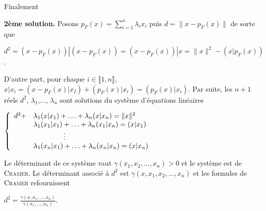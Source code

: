 {\begin{enumerate}
{Finalement 

\begin{center}
\end{center}

\textbf{2ème solution.} Posons $p_F(x) =\sum_{i=1}^{n}\lambda_ix_i$ puis  $d =\|x-p_F(x)\|$ de sorte que

\begin{center}
$d^2 =(x-p_F(x))|(x-p_F(x)) =(x-p_F(x))|x =\|x\|^2 -(x|p_F(x))$.
\end{center}

D'autre part, pour chaque $i\in\llbracket1,n\rrbracket$, $x|x_i=(x-p_F(x)|x_I)+(p_F(x)|x_i)=(p_F(x)|x_i)$. Par suite, les $n+1$ réels $d^2$, $\lambda_1$,..., $\lambda_n$ sont solutions du système d'équations linéaires
 
\begin{center}
$\left\{
\begin{array}{ll}
d^2+&\lambda_1(x|x_1)+\ldots+\lambda_n(x|x_n)=\|x\|^2\\
 &\lambda_1(x_1|x_1)+\ldots+\lambda_n(x_1|x_n)=(x|x_1)\\
 &\rule{1,5cm}{0mm}\vdots\\
 &\lambda_1(x_n|x_1)+\ldots+\lambda_n(x_n|x_n)=(x|x_n)
\end{array}
\right.$
\end{center}

Le déterminant de ce système vaut $\gamma(x_1,x_2,...,x_n)>0$ et le système est de \textsc{Cramer}. Le déterminant associé à $d^2$ est $\gamma(x,x_1,x_2,...,x_n)$ et les formules de \textsc{Cramer} refournissent

\begin{center}
$d^2=\frac{\gamma(x,x_1,\ldots,x_n)}{\gamma(x_1,\ldots,x_n)}$.
\end{center}}
\end{enumerate}
}